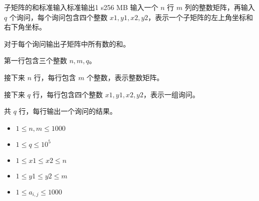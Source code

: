 \begin{problem}{子矩阵的和}{标准输入}{标准输出}{1 s}{256 MB}
输入一个 $n$ 行 $m$ 列的整数矩阵，再输入 $q$ 个询问，每个询问包含四个整数 $x1,y1,x2,y2$，表示一个子矩阵的左上角坐标和右下角坐标。

对于每个询问输出子矩阵中所有数的和。

\InputFile
第一行包含三个整数 $n, m, q$。

接下来 $n$ 行，每行包含 $m$ 个整数，表示整数矩阵。

接下来 $q$ 行，每行包含四个整数 $x1,y1,x2,y2$，表示一组询问。

\OutputFile
共 $q$ 行，每行输出一个询问的结果。

\Example

\begin{example}
\end{example}

\Constraints

\begin{itemize}
    \item $1 \leq n, m \leq 1000$
    \item $1 \leq q \leq 10 ^ 5$
    \item $1 \leq x1 \leq x2 \leq n$
    \item $1 \leq y1 \leq y2 \leq m$
    \item $1 \leq a_{i,j} \leq 1000$
\end{itemize}

\end{problem}
